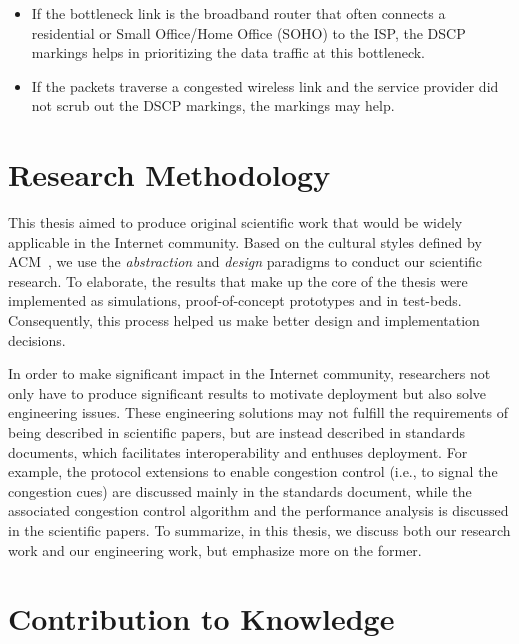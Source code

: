 
\begin{itemize}

  \item If the bottleneck link is the broadband router that often connects a
  residential or Small Office/Home Office (SOHO) to the ISP, the DSCP markings
  helps in prioritizing the data traffic at this bottleneck.

  \item If the packets traverse a congested wireless link and the service
  provider did not scrub out the DSCP markings, the markings may help.

\end{itemize}

\section{Research Methodology}

This thesis aimed to produce original scientific work that would be widely
applicable in the Internet community. Based on the cultural styles defined by
ACM~\cite{Denning:CS.Method}, we use the \textit{abstraction} and
\textit{design} paradigms to conduct our scientific research. To elaborate,
the results that make up the core of the thesis were implemented as
simulations, proof-of-concept prototypes and in test-beds. Consequently, this
process helped us make better design and implementation decisions.

In order to make significant impact in the Internet community, researchers not
only have to produce significant results to motivate deployment but also solve
engineering issues. These engineering solutions may not fulfill the
requirements of being described in scientific papers, but are instead
described in standards documents, which facilitates interoperability and
enthuses deployment. For example, the protocol extensions to enable congestion
control (i.e., to signal the congestion cues) are discussed mainly in the
standards document, while the associated congestion control algorithm and the
performance analysis is discussed in the scientific papers. To summarize, in
this thesis, we discuss both our research work and our engineering work, but
emphasize more on the former.

\section{Contribution to Knowledge}

